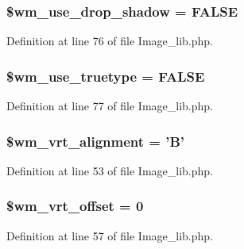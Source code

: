 \subsubsection[{\$wm\-\_\-use\-\_\-drop\-\_\-shadow}]{\setlength{\rightskip}{0pt plus 5cm}\$wm\-\_\-use\-\_\-drop\-\_\-shadow = F\-A\-L\-S\-E}\label{class_c_i___image__lib_a49b77ed476cebe5f357705e7a9c4ccce}


Definition at line 76 of file Image\-\_\-lib.\-php.

\subsubsection[{\$wm\-\_\-use\-\_\-truetype}]{\setlength{\rightskip}{0pt plus 5cm}\$wm\-\_\-use\-\_\-truetype = F\-A\-L\-S\-E}\label{class_c_i___image__lib_a0415d8aa18349f21751f7a81255918ad}


Definition at line 77 of file Image\-\_\-lib.\-php.

\subsubsection[{\$wm\-\_\-vrt\-\_\-alignment}]{\setlength{\rightskip}{0pt plus 5cm}\$wm\-\_\-vrt\-\_\-alignment = 'B'}\label{class_c_i___image__lib_a1c52f46917a30e084db07a8c8e13af86}


Definition at line 53 of file Image\-\_\-lib.\-php.

\subsubsection[{\$wm\-\_\-vrt\-\_\-offset}]{\setlength{\rightskip}{0pt plus 5cm}\$wm\-\_\-vrt\-\_\-offset = 0}\label{class_c_i___image__lib_a577602650e0c67f9f4bfcdeda075fa50}


Definition at line 57 of file Image\-\_\-lib.\-php.

